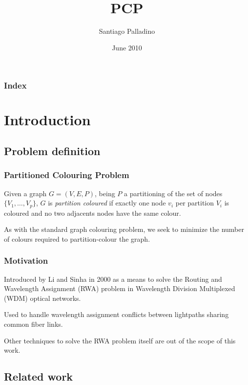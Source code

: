 \documentclass{beamer}
\begin{document}
\title{PCP}
\author{Santiago Palladino}
\date{June 2010}

\begin{frame}
\titlepage
\end{frame}

\begin{frame}
\frametitle{Index}
\tableofcontents
\end{frame} 

\setlength{\parskip}{10pt plus 1pt minus 1pt}

\section{Introduction}
\subsection{Problem definition}

\begin{frame}
\frametitle{Partitioned Colouring Problem}

\begin{definition}
Given a graph $G=(V,E,P)$, being $P$ a partitioning of the set of nodes $\{V_1,\ldots,V_p\}$, $G$ is \textit{partition coloured} if exactly one node $v_i$ per partition $V_i$ is coloured and no two adjacents nodes have the same colour.
\end{definition}

As with the standard graph colouring problem, we seek to minimize the number of colours required to partition-colour the graph.

\end{frame} 

\begin{frame} 
\frametitle{Motivation}

Introduced by Li and Sinha in 2000 as a means to solve the Routing and Wavelength Assignment (RWA) problem in Wavelength Division Multiplexed (WDM) optical networks. 

Used to handle wavelength assignment conflicts between lightpaths sharing common fiber links.

Other techniques to solve the RWA problem itself are out of the scope of this work.

\end{frame} 

\subsection{Related work}
\end{document}
